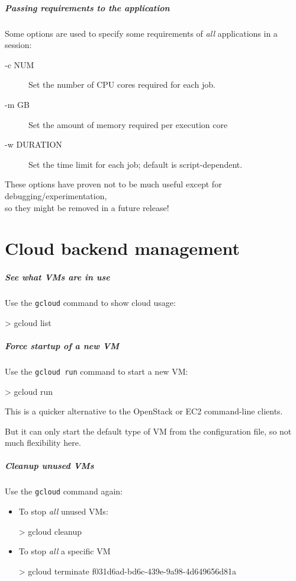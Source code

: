 \documentclass[english,serif,mathserif,usenames,dvipsnames]{beamer}
\begin{document}
\begin{frame}
  \frametitle{Passing requirements to the application}
  Some options are used to specify some requirements of \emph{all}
  applications in a session:
  \begin{description}
  \item[-c NUM] Set the number of CPU cores required for each job.
  \item[-m GB] Set the amount of memory required per execution core
  \item[-w DURATION] Set the time limit for each job; default is script-dependent.
  \end{description}

  \+ These options have proven not to be much useful except for
  debugging/experimentation, \\ so \alert{they might be removed in a
    future release!}
\end{frame}


\part{Cloud backend management}

\begin{frame}
  \frametitle{See what VMs are in use}

  Use the \texttt{gcloud} command to show cloud usage:
\begin{semiverbatim}
    > gcloud list
\end{semiverbatim}

\end{frame}


\begin{frame}
  \frametitle{Force startup of a new VM}

  Use the \texttt{gcloud run} command to start a new VM:
\begin{semiverbatim}
    > gcloud run
\end{semiverbatim}

  \+ This is a quicker alternative to the
  OpenStack or EC2 command-line clients.

  \+ But it can only start the default type of VM from the
  configuration file, so not much flexibility here.
\end{frame}


\begin{frame}
  \frametitle{Cleanup unused VMs}

  Use the \texttt{gcloud} command again:

  \begin{itemize}
  \item To stop \emph{all} unused VMs:
\begin{semiverbatim}
    > gcloud cleanup
\end{semiverbatim}

  \item To stop \emph{all} a specific VM
\begin{semiverbatim}
    > gcloud terminate f031d6ad-bd6c-439e-9a98-4d649656d81a
\end{semiverbatim}
  \end{itemize}
\end{frame}
\end{document}
